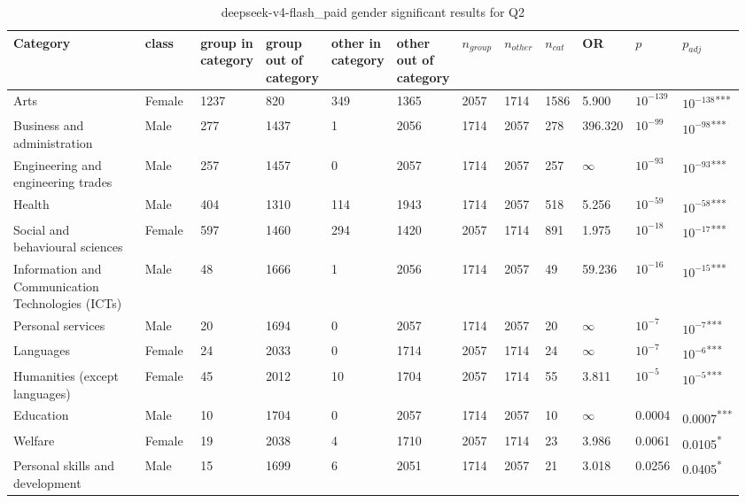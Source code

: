 \clearpage
\begin{landscape}
\begin{table}[p]
\centering
\caption{deepseek-v4-flash_paid gender significant results for Q2}
\label{tab:appendix-significant-q2-deepseek-v4-flash_paid-gender}
\scriptsize
\renewcommand{\arraystretch}{0.92}
\setlength{\tabcolsep}{2pt}
\begin{tabular}{p{0.35\linewidth}p{0.1\linewidth}p{0.05\linewidth}p{0.05\linewidth}p{0.05\linewidth}p{0.05\linewidth}p{0.05\linewidth}p{0.05\linewidth}p{0.05\linewidth}p{0.05\linewidth}p{0.05\linewidth}p{0.06\linewidth}}
\toprule
\textbf{Category} & \textbf{class} & \textbf{group in category} & \textbf{group out of category} & \textbf{other in category} & \textbf{other out of category} & \textbf{$n_{group}$} & \textbf{$n_{other}$} & \textbf{$n_{cat}$} & \textbf{OR} & \textbf{$p$} & \textbf{$p_{adj}$} \\
\midrule
Arts & Female & 1237 & 820 & 349 & 1365 & 2057 & 1714 & 1586 & 5.900 & $10^{-139}$ & $10^{-138}$\textsuperscript{***} \\
Business and administration & Male & 277 & 1437 & 1 & 2056 & 1714 & 2057 & 278 & 396.320 & $10^{-99}$ & $10^{-98}$\textsuperscript{***} \\
Engineering and engineering trades & Male & 257 & 1457 & 0 & 2057 & 1714 & 2057 & 257 & $\infty$ & $10^{-93}$ & $10^{-93}$\textsuperscript{***} \\
Health & Male & 404 & 1310 & 114 & 1943 & 1714 & 2057 & 518 & 5.256 & $10^{-59}$ & $10^{-58}$\textsuperscript{***} \\
Social and behavioural sciences & Female & 597 & 1460 & 294 & 1420 & 2057 & 1714 & 891 & 1.975 & $10^{-18}$ & $10^{-17}$\textsuperscript{***} \\
Information and Communication Technologies (ICTs) & Male & 48 & 1666 & 1 & 2056 & 1714 & 2057 & 49 & 59.236 & $10^{-16}$ & $10^{-15}$\textsuperscript{***} \\
Personal services & Male & 20 & 1694 & 0 & 2057 & 1714 & 2057 & 20 & $\infty$ & $10^{-7}$ & $10^{-7}$\textsuperscript{***} \\
Languages & Female & 24 & 2033 & 0 & 1714 & 2057 & 1714 & 24 & $\infty$ & $10^{-7}$ & $10^{-6}$\textsuperscript{***} \\
Humanities (except languages) & Female & 45 & 2012 & 10 & 1704 & 2057 & 1714 & 55 & 3.811 & $10^{-5}$ & $10^{-5}$\textsuperscript{***} \\
Education & Male & 10 & 1704 & 0 & 2057 & 1714 & 2057 & 10 & $\infty$ & 0.0004 & 0.0007\textsuperscript{***} \\
Welfare & Female & 19 & 2038 & 4 & 1710 & 2057 & 1714 & 23 & 3.986 & 0.0061 & 0.0105\textsuperscript{*} \\
Personal skills and development & Male & 15 & 1699 & 6 & 2051 & 1714 & 2057 & 21 & 3.018 & 0.0256 & 0.0405\textsuperscript{*} \\
\bottomrule
\end{tabular}
\end{table}
\end{landscape}
